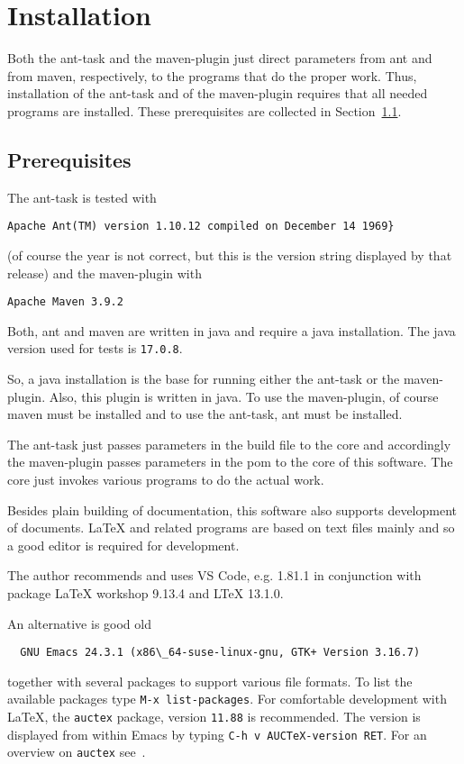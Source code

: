 
\chapter{Installation}\label{chap:install}

Both the ant-task and the maven-plugin just direct parameters 
from ant and from maven, respectively, 
to the programs that do the proper work. 
Thus, installation of the ant-task and of the maven-plugin 
requires that all needed programs are installed. 
These prerequisites are collected in Section~\ref{sec:prerequisites}. 

\section{Prerequisites}\label{sec:prerequisites}

The ant-task is tested with 
%
\begin{verbatim}
Apache Ant(TM) version 1.10.12 compiled on December 14 1969}
\end{verbatim}
%
(of course the year is not correct, but this is the version string
displayed by that release) and the maven-plugin with 
%
\begin{verbatim}
Apache Maven 3.9.2 
\end{verbatim}
%
Both, ant and maven are written in java and require a java installation. 
The java version used for tests is \texttt{17.0.8}. 


So, a java installation is the base for running either the ant-task 
or the maven-plugin. 
Also, this plugin is written in java. 
To use the maven-plugin, of course maven must be installed 
and to use the ant-task, ant must be installed. 

The ant-task just passes parameters in the build file to the core 
and accordingly the maven-plugin passes parameters in the pom 
to the core of this software. 
The core just invokes various programs to do the actual work. 

Besides plain building of documentation, 
this software also supports development of documents. 
\LaTeX{} and related programs are based on text files mainly 
and so a good editor is required for development. 

The author recommends and uses VS Code, e.g. 1.81.1 
in conjunction with package \LaTeX{} workshop 9.13.4 and LTeX 13.1.0. 

An alternative is good old 
%
\begin{verbatim}
  GNU Emacs 24.3.1 (x86\_64-suse-linux-gnu, GTK+ Version 3.16.7)
\end{verbatim}
%
together with several packages to support 
various file formats. 
To list the available packages type 
\texttt{M-x list-packages}. 
For comfortable development with \LaTeX, 
the \texttt{auctex} package, version \texttt{11.88} is recommended. 
The version is displayed from within Emacs 
by typing \texttt{C-h v AUCTeX-version RET}. 
For an overview on \texttt{auctex} see~\cite{AucTeX}. 


